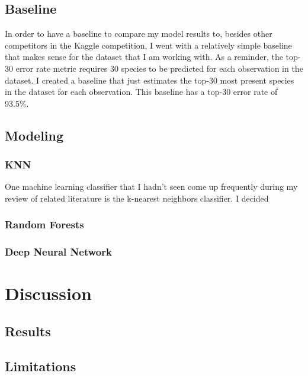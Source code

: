 \documentclass[12pt, oneside]{article}
\begin{document}
\begin{normalsize}
\subsection{Baseline}

In order to have a baseline to compare my model results to, besides other competitors in the Kaggle competition, I went with a relatively simple baseline that makes sense for the dataset that I am working with. As a reminder, the top-30 error rate metric requires 30 species to be predicted for each observation in the dataset. I created a baseline that just estimates the top-30 most present species in the dataset for each observation. This baseline has a top-30 error rate of 93.5\%.

\subsection{Modeling}

\subsubsection{KNN}

One machine learning classifier that I hadn't seen come up frequently during my review of related literature is the k-nearest neighbors classifier. I decided 

\subsubsection{Random Forests}

\subsubsection{Deep Neural Network}

\end{normalsize}

\section{Discussion}
\label{Discussion}

\begin{normalsize}

\subsection{Results}

\subsection{Limitations}

\end{normalsize}
\end{document}
